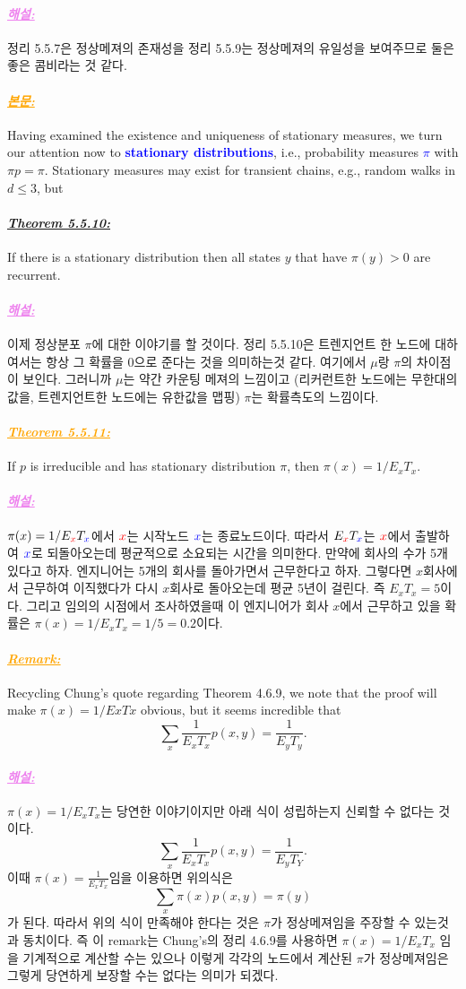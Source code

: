 \documentclass[12pt,oneside,english,a4paper]{article}
\newcommand{\para}[1]{\paragraph{\LARGE\it\underline{\textbf{#1:}}}\LARGE}
\newcommand{\paraviolet}[1]{\paragraph{\LARGE\textcolor{violet}{\it\underline{\textbf{#1:}}}}\LARGE}
\newcommand{\paraorange}[1]{\paragraph{\LARGE\textcolor{orange}{\it\underline{\textbf{#1:}}}}\LARGE}
\begin{document}
\paraviolet{해설} 정리 5.5.7은 정상메져의 존재성을 정리 5.5.9는 정상메져의 유일성을 보여주므로 둘은 좋은 콤비라는 것 같다. 

\paraorange{본문} Having examined the existence and uniqueness of stationary measures, we turn our attention now to \textcolor{blue}{\bf stationary distributions}, i.e., probability measures \textcolor{blue}{$\pi$} with $\pi p= \pi$. Stationary measures may exist for transient chains, e.g., random walks in $d \leq 3$, but

\para{Theorem 5.5.10} If there is a stationary distribution then all states $y$ that have $\pi(y)>0$ are recurrent.

\paraviolet{해설} 이제 정상분포 $\pi$에 대한 이야기를 할 것이다. 정리 5.5.10은 트렌지언트 한 노드에 대하여서는 항상 그 확률을 0으로 준다는 것을 의미하는것 같다. 여기에서 $\mu$랑 $\pi$의 차이점이 보인다. 그러니까 $\mu$는 약간 카운팅 메져의 느낌이고 (리커런트한 노드에는 무한대의 값을, 트렌지언트한 노드에는 유한값을 맵핑) $\pi$는 확률측도의 느낌이다. 

\paraorange{Theorem 5.5.11} If $p$ is irreducible and has stationary distribution $\pi$, then $\pi(x)=1/E_xT_x$.

\paraviolet{해설} $\pi(x)=1/E_{\textcolor{red}{x}}T_{\textcolor{blue}{x}}$에서 $\textcolor{red}{x}$는 시작노드 $\textcolor{blue}{x}$는 종료노드이다. 따라서 $E_{\textcolor{red}{x}}T_{\textcolor{blue}{x}}$는 $\textcolor{red}{x}$에서 출발하여 $\textcolor{blue}{x}$로 되돌아오는데 평균적으로 소요되는 시간을 의미한다. 만약에 회사의 수가 5개 있다고 하자. 엔지니어는 5개의 회사를 돌아가면서 근무한다고 하자. 그렇다면 $x$회사에서 근무하여 이직했다가 다시 $x$회사로 돌아오는데 평균 5년이 걸린다. 즉 $E_xT_x=5$이다. 그리고 임의의 시점에서 조사하였을때 이 엔지니어가 회사 $x$에서 근무하고 있을 확률은 $\pi(x)=1/E_xT_x=1/5=0.2$이다. 

\paraorange{Remark} Recycling Chung’s quote regarding Theorem 4.6.9, we note that the proof will make $\pi(x)=1/ExTx$ obvious, but it seems incredible that
\[
\sum_{x}\frac{1}{E_xT_x}p(x,y)=\frac{1}{E_yT_y}.
\]
\paraviolet{해설} $\pi(x)=1/E_xT_x$는 당연한 이야기이지만 아래 식이 성립하는지 신뢰할 수 없다는 것이다. 
\[
\sum_{x}\frac{1}{E_xT_x}p(x,y)=\frac{1}{E_yT_Y}.
\]
이때 $\pi(x)=\frac{1}{E_xT_x}$임을 이용하면 위의식은 
\[
\sum_{x}\pi(x)p(x,y)=\pi(y)
\]
가 된다. 따라서 위의 식이 만족해야 한다는 것은 $\pi$가 정상메져임을 주장할 수 있는것과 동치이다. 즉 이 remark는 Chung’s의 정리 4.6.9를 사용하면 $\pi(x)=1/E_xT_x$ 임을 기계적으로 계산할 수는 있으나 이렇게 각각의 노드에서 계산된 $\pi$가 정상메져임은 그렇게 당연하게 보장할 수는 없다는 의미가 되겠다. 
\end{document}
